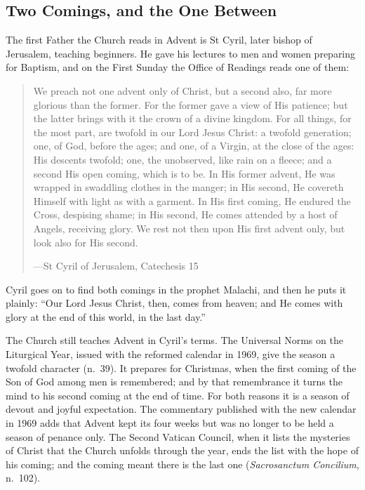\subsection{Two Comings, and the One Between}\label{sec:comings}

The first Father the Church reads in Advent is St Cyril, later bishop of
Jerusalem, teaching beginners. He gave his lectures to men and women preparing
for Baptism, and on the First Sunday the Office of Readings reads one of them:

\begin{quote}
We preach not one advent only of Christ, but a second also, far more glorious
than the former. For the former gave a view of His patience; but the latter
brings with it the crown of a divine kingdom. For all things, for the most part,
are twofold in our Lord Jesus Christ: a twofold generation; one, of God, before
the ages; and one, of a Virgin, at the close of the ages: His descents twofold;
one, the unobserved, like rain on a fleece; and a second His open coming, which
is to be. In His former advent, He was wrapped in swaddling clothes in the
manger; in His second, He covereth Himself with light as with a garment. In His
first coming, He endured the Cross, despising shame; in His second, He comes
attended by a host of Angels, receiving glory. We rest not then upon His first
advent only, but look also for His second.\par
{\smallskip\noindent\small ---St Cyril of Jerusalem, Catechesis 15\par}
\end{quote}

\noindent Cyril goes on to find both comings in the prophet Malachi, and then he
puts it plainly: ``Our Lord Jesus Christ, then, comes from heaven; and He comes
with glory at the end of this world, in the last day.''

The Church still teaches Advent in Cyril's terms. The Universal Norms on the
Liturgical Year, issued with the reformed calendar in 1969, give the season a
twofold character (n.~39). It prepares for Christmas, when the first coming of
the Son of God among men is remembered; and by that remembrance it turns the
mind to his second coming at the end of time. For both reasons it is a season
of devout and joyful expectation. The commentary published with the new
calendar in 1969 adds that Advent kept its four weeks but was no longer to be
held a season of penance only. The Second Vatican Council, when it lists the
mysteries of Christ that the Church unfolds through the year, ends the list with
the hope of his coming; and the coming meant there is the last one
(\emph{Sacrosanctum Concilium}, n.~102).

